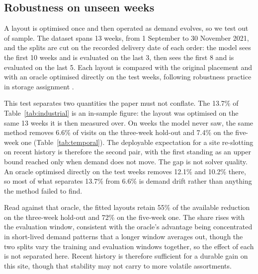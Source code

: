 \documentclass[]{interact}
\begin{document}
\subsection{Robustness on unseen weeks}\label{sec:temporal}
A layout is optimised once and then operated as demand evolves, so we test out of sample. The dataset spans 13 weeks, from 1 September to 30 November 2021, and the splits are cut on the recorded delivery date of each order: the model sees the first 10 weeks and is evaluated on the last 3, then sees the first 8 and is evaluated on the last 5. Each layout is compared with the original placement and with an oracle optimised directly on the test weeks, following robustness practice in storage assignment \citep{lee2020cie, wang2020}.

This test separates two quantities the paper must not conflate. The 13.7\% of Table~\ref{tab:industrial} is an in-sample figure: the layout was optimised on the same 13 weeks it is then measured over. On weeks the model never saw, the same method removes 6.6\% of visits on the three-week hold-out and 7.4\% on the five-week one (Table~\ref{tab:temporal}). The deployable expectation for a site re-slotting on recent history is therefore the second pair, with the first standing as an upper bound reached only when demand does not move. The gap is not solver quality. An oracle optimised directly on the test weeks removes 12.1\% and 10.2\% there, so most of what separates 13.7\% from 6.6\% is demand drift rather than anything the method failed to find.

Read against that oracle, the fitted layouts retain 55\% of the available reduction on the three-week hold-out and 72\% on the five-week one. The share rises with the evaluation window, consistent with the oracle's advantage being concentrated in short-lived demand patterns that a longer window averages out, though the two splits vary the training and evaluation windows together, so the effect of each is not separated here. Recent history is therefore sufficient for a durable gain on this site, though that stability may not carry to more volatile assortments.
\end{document}
